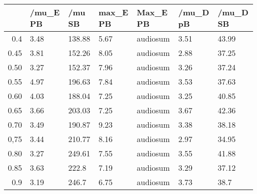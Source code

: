 \begin{table}[ht]
\centering
\begin{tabular}{rllllll}
  \hline
 & /mu\_E PB & /mu SB & max\_E PB & Max\_E PB & /mu\_D pB & /mu\_D SB \\ 
  \hline
0.4 & 3.48 & 138.88 & 5.67 & audiosum & 3.51 & 43.99 \\ 
  0.45 & 3.81 & 152.26 & 8.05 & audiosum & 2.88 & 37.25 \\ 
  0.50 & 3.27 & 152.37 & 7.96 & audiosum & 3.26 & 37.24 \\ 
  0.55 & 4.97 & 196.63 & 7.84 & audiosum & 3.53 & 37.63 \\ 
  0.60 & 4.03 & 188.04 & 7.25 & audiosum & 3.25 & 40.85 \\ 
  0.65 & 3.66 & 203.03 & 7.25 & audiosum & 3.67 & 42.36 \\ 
  0.70 & 3.49 & 190.87 & 9.23 & audiosum & 3.38 & 38.18 \\ 
  0,75 & 3.44 & 210.77 & 8.16 & audiosum & 2.97 & 34.95 \\ 
  0.80 & 3.27 & 249.61 & 7.55 & audiosum & 3.55 & 41.88 \\ 
  0.85 & 3.63 & 222.8 & 7.19 & audiosum & 3.29 & 37.12 \\ 
  0.9 & 3.19 & 246.7 & 6.75 & audiosum & 3.73 & 38.7 \\ 
   \hline
\end{tabular}
\end{table}
